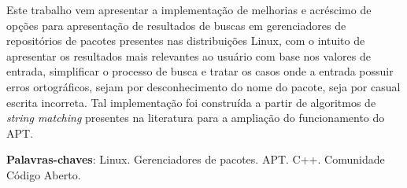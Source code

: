 \begin{resumo}

    

Este trabalho vem apresentar a implementação de melhorias e acréscimo de opções para  apresentação de resultados de buscas em gerenciadores de repositórios de pacotes presentes nas distribuições Linux, com o intuito de apresentar os resultados mais relevantes ao usuário com base nos valores de entrada, simplificar o processo de busca e tratar os casos onde a entrada possuir erros ortográficos, sejam por desconhecimento do nome do pacote, seja por casual escrita incorreta. Tal implementação foi construída a partir de algoritmos de \textit{string matching} presentes na literatura para a ampliação do funcionamento do APT.

 \vspace{\onelineskip}
    
 \noindent
 \textbf{Palavras-chaves}: Linux. Gerenciadores de pacotes. APT. C++. Comunidade Código Aberto.
\end{resumo}

